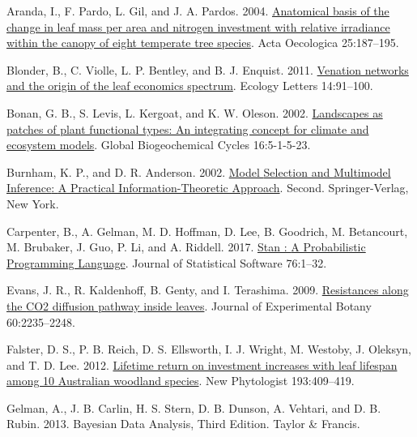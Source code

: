 \documentclass[
  12pt,
  a4paper,
,tablecaptionabove
]{scrartcl}
\newlength{\cslhangindent}
\newenvironment{CSLReferences}[2] %
 {%
  \setlength{\parindent}{0pt}
  \ifodd #1 \everypar{\setlength{\hangindent}{\cslhangindent}}\ignorespaces\fi
  \ifnum #2 > 0
  \setlength{\parskip}{#2\baselineskip}
  \fi
 }%
 {}
\begin{document}
\hypertarget{refs}{}
\begin{CSLReferences}{1}{0}
\leavevmode{}%
Aranda, I., F. Pardo, L. Gil, and J. A. Pardos. 2004. \href{https://doi.org/10.1016/j.actao.2004.01.003}{Anatomical basis of the change in leaf mass per area and nitrogen investment with relative irradiance within the canopy of eight temperate tree species}. Acta Oecologica 25:187--195.

\leavevmode{}%
Blonder, B., C. Violle, L. P. Bentley, and B. J. Enquist. 2011. \href{https://doi.org/10.1111/j.1461-0248.2010.01554.x}{Venation networks and the origin of the leaf economics spectrum}. Ecology Letters 14:91--100.

\leavevmode{}%
Bonan, G. B., S. Levis, L. Kergoat, and K. W. Oleson. 2002. \href{https://doi.org/10.1029/2000GB001360}{Landscapes as patches of plant functional types: {An} integrating concept for climate and ecosystem models}. Global Biogeochemical Cycles 16:5-1-5-23.

\leavevmode{}%
Burnham, K. P., and D. R. Anderson. 2002. \href{https://doi.org/10.1007/b97636}{Model {Selection} and {Multimodel Inference}: {A Practical Information-Theoretic Approach}}. Second. {Springer-Verlag}, {New York}.

\leavevmode{}%
Carpenter, B., A. Gelman, M. D. Hoffman, D. Lee, B. Goodrich, M. Betancourt, M. Brubaker, J. Guo, P. Li, and A. Riddell. 2017. \href{https://doi.org/10.18637/jss.v076.i01}{Stan : {A Probabilistic Programming Language}}. Journal of Statistical Software 76:1--32.

\leavevmode{}%
Evans, J. R., R. Kaldenhoff, B. Genty, and I. Terashima. 2009. \href{https://doi.org/10.1093/jxb/erp117}{Resistances along the {CO2} diffusion pathway inside leaves}. Journal of Experimental Botany 60:2235--2248.

\leavevmode{}%
Falster, D. S., P. B. Reich, D. S. Ellsworth, I. J. Wright, M. Westoby, J. Oleksyn, and T. D. Lee. 2012. \href{https://doi.org/10.1111/j.1469-8137.2011.03940.x}{Lifetime return on investment increases with leaf lifespan among 10 {Australian} woodland species}. New Phytologist 193:409--419.

\leavevmode{}%
Gelman, A., J. B. Carlin, H. S. Stern, D. B. Dunson, A. Vehtari, and D. B. Rubin. 2013. Bayesian {Data Analysis}, {Third Edition}. {Taylor \& Francis}.


\end{CSLReferences}
\end{document}
